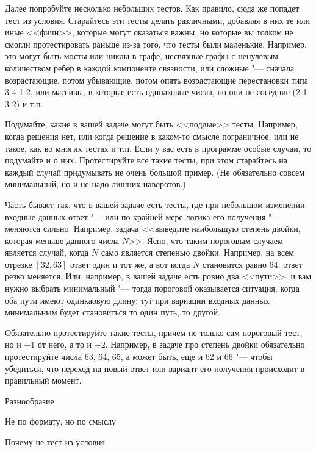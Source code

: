 \documentclass[a4paper,10pt]{problems}
\begin{document}
Далее попробуйте несколько небольших тестов. Как правило, сюда же попадет тест из условия. 
Старайтесь эти тесты делать различными, добавляя в них те или иные <<фичи>>, которые могут оказаться важны, 
но которые вы толком не смогли протестировать раньше из-за того, что тесты были маленькие. 
Например, это могут быть мосты или циклы в графе, несвязные графы с ненулевым количеством ребер в каждой компоненте связности, 
или сложные "--- сначала возрастающие, потом убывающие, потом опять возрастающие перестановки типа 3 4 1 2, или массивы, в которые есть одинаковые числа, 
но они не соседние (2 1 3 2) и т.п.

Подумайте, какие в вашей задаче могут быть <<подлые>> тесты. 
Например, когда решения нет, или когда решение в каком-то смысле пограничное, или не такое, как во многих тестах и т.п.
Если у вас есть в программе особые случаи, то подумайте и о них. 
Протестируйте все такие тесты, при этом старайтесь на каждый случай придумывать не очень большой пример. 
(Не обязательно совсем минимальный, но и не надо лишних наворотов.)

Часть бывает так, что в вашей задаче есть тесты, где при небольшом изменении входные данных ответ "--- или по крайней мере логика его получения "--- меняются сильно.
Например, задача <<выведите наибольшую степень двойки, которая меньше данного числа $N$>>. 
Ясно, что таким пороговым случаем является случай, когда $N$ само является степенью двойки. 
Например, на всем отрезке $[32,63]$ ответ один и тот же, а вот когда $N$ становится равно 64, ответ резко меняется.
Или, например, в вашей задаче есть ровно два <<пути>>, и вам нужно выбрать минимальный "--- тогда пороговой оказывается ситуация,
когда оба пути имеют одинкаовую длину: тут при вариации входных данных минимальным будет становиться то один путь, то другой.

Обязательно протестируйте такие тесты, причем не только сам пороговый тест, но и $\pm 1$ от него, а то и $\pm 2$. 
Например, в задаче про степень двойки обязательно протестируйте числа 63, 64, 65, а может быть, еще и 62 и 66 "--- 
чтобы убедиться, что переход на новый ответ или вариант его получения происходит в правильный момент.


Разнообразие

Не по формату, но по смыслу

Почему не тест из условия


\end{document}
